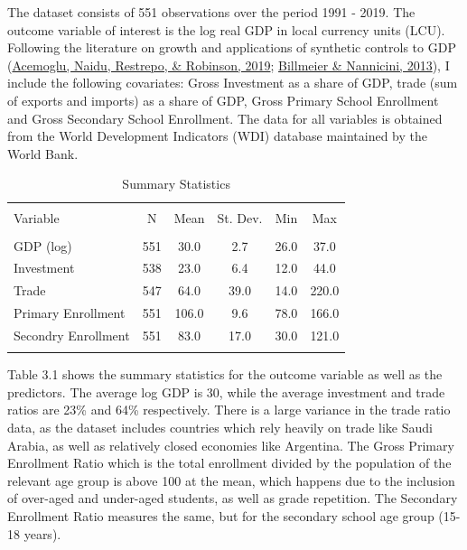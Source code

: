 \documentclass[12pt,nobind, a4paper]{reedthesis}
\begin{document}
 The dataset consists of 551 observations over the period 1991 - 2019. The outcome variable of interest is the log real GDP in local currency units (LCU). Following the literature on growth and applications of synthetic controls to GDP (\protect\hyperlink{ref-acemoglu_democracy_2019}{Acemoglu, Naidu, Restrepo, \& Robinson, 2019}; \protect\hyperlink{ref-billmeier_assessing_2013}{Billmeier \& Nannicini, 2013}), I include the following covariates: Gross Investment as a share of GDP, trade (sum of exports and imports) as a share of GDP, Gross Primary School Enrollment and Gross Secondary School Enrollment. The data for all variables is obtained from the World Development Indicators (WDI) database maintained by the World Bank.
 \linebreak
 \begin{table}[!htbp] \centering 
   \caption{ Summary Statistics} 
   \label{} 
 \begin{tabular}{@{\extracolsep{5pt}}lccccc} 
 \\[-1.8ex]\hline 
 \hline \\[-1.8ex] 
 Variable & \multicolumn{1}{c}{N} & \multicolumn{1}{c}{Mean} & \multicolumn{1}{c}{St. Dev.} & \multicolumn{1}{c}{Min} & \multicolumn{1}{c}{Max} \\ 
 \hline \\[-1.8ex] 
 GDP (log) & 551 & 30.0 & 2.7 & 26.0 & 37.0 \\ 
 Investment & 538 & 23.0 & 6.4 & 12.0 & 44.0 \\ 
 Trade & 547 & 64.0 & 39.0 & 14.0 & 220.0 \\ 
 Primary Enrollment & 551 & 106.0 & 9.6 & 78.0 & 166.0 \\ 
 Secondry Enrollment & 551 & 83.0 & 17.0 & 30.0 & 121.0 \\ 
 \hline \\[-1.8ex] 
 \end{tabular} 
 \end{table}
 Table 3.1 shows the summary statistics for the outcome variable as well as the predictors. The average log GDP is 30, while the average investment and trade ratios are 23\% and 64\% respectively. There is a large variance in the trade ratio data, as the dataset includes countries which rely heavily on trade like Saudi Arabia, as well as relatively closed economies like Argentina. The Gross Primary Enrollment Ratio which is the total enrollment divided by the population of the relevant age group is above 100 at the mean, which happens due to the inclusion of over-aged and under-aged students, as well as grade repetition. The Secondary Enrollment Ratio measures the same, but for the secondary school age group (15-18 years).
 \linebreak
\end{document}
